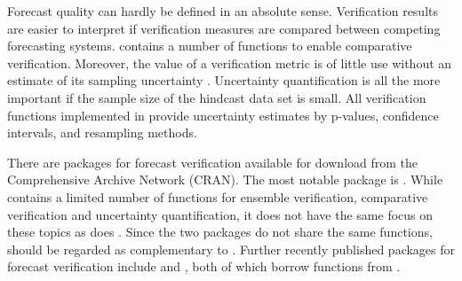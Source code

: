 \documentclass[article]{jss}\usepackage{graphicx, color}
\begin{document}
Forecast quality can hardly be defined in an absolute sense.
Verification results are easier to interpret if verification measures are compared between competing forecasting systems.
 contains a number of functions to enable comparative verification. 
Moreover, the value of a verification metric is of little use without an estimate of its sampling uncertainty \citep{jolliffe2007uncertainty}.
Uncertainty quantification is all the more important if the sample size of the hindcast data set is small.  
All verification functions implemented in  provide uncertainty estimates by p-values, confidence intervals, and resampling methods.


There are packages for forecast verification available for download from the Comprehensive  Archive Network (CRAN).
The most notable package is  \citep{cran_verification}. 
While  contains a limited number of functions for ensemble verification, comparative verification and uncertainty quantification, it does not have the same focus on these topics as does .
Since the two packages do not share the same functions,  should be regarded as complementary to .
Further recently published  packages for forecast verification include  \citep{cran_easyverification} and  \citep{cran_s2dverification}, both of which borrow functions from .
\end{document}
